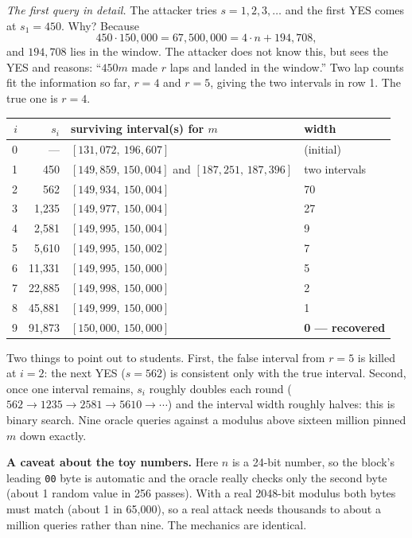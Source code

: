 \documentclass[11pt]{article}
\begin{document}
\emph{The first query in detail.} The attacker tries $s=1,2,3,\dots$ and the first YES comes at $s_1=450$. Why? Because
\[
450\cdot150{,}000 = 67{,}500{,}000 = 4\cdot n + 194{,}708,
\]
and $194{,}708$ lies in the window. The attacker does not know this, but sees the YES and reasons: ``$450m$ made $r$ laps and landed in the window.'' Two lap counts fit the information so far, $r=4$ and $r=5$, giving the two intervals in row 1. The true one is $r=4$.

\begin{center}
\begin{tabular}{@{}rrll@{}}
\toprule
$i$ & $s_i$ & surviving interval(s) for $m$ & width \\
\midrule
0 & --- & $[131{,}072,\ 196{,}607]$ & (initial) \\
1 & 450 & $[149{,}859,\,150{,}004]$ and $[187{,}251,\,187{,}396]$ & two intervals \\
2 & 562 & $[149{,}934,\ 150{,}004]$ & 70 \\
3 & 1{,}235 & $[149{,}977,\ 150{,}004]$ & 27 \\
4 & 2{,}581 & $[149{,}995,\ 150{,}004]$ & 9 \\
5 & 5{,}610 & $[149{,}995,\ 150{,}002]$ & 7 \\
6 & 11{,}331 & $[149{,}995,\ 150{,}000]$ & 5 \\
7 & 22{,}885 & $[149{,}998,\ 150{,}000]$ & 2 \\
8 & 45{,}881 & $[149{,}999,\ 150{,}000]$ & 1 \\
9 & 91{,}873 & $[150{,}000,\ 150{,}000]$ & \textbf{0 --- recovered} \\
\bottomrule
\end{tabular}
\end{center}

Two things to point out to students. First, the false interval from $r=5$ is killed at $i=2$: the next YES ($s=562$) is consistent only with the true interval. Second, once one interval remains, $s_i$ roughly doubles each round ($562\to1235\to2581\to5610\to\cdots$) and the interval width roughly halves: this is binary search. Nine oracle queries against a modulus above sixteen million pinned $m$ down exactly.

\textbf{A caveat about the toy numbers.} Here $n$ is a 24-bit number, so the block's leading \texttt{00} byte is automatic and the oracle really checks only the second byte (about 1 random value in 256 passes). With a real 2048-bit modulus both bytes must match (about 1 in 65{,}000), so a real attack needs thousands to about a million queries rather than nine. The mechanics are identical.
\end{document}
